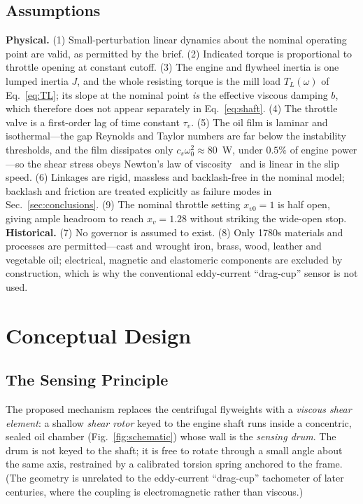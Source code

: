 \documentclass[conference]{IEEEtran}
\begin{document}
\subsection{Assumptions}
\textbf{Physical.} (1) Small-perturbation linear dynamics about the nominal
operating point are valid, as permitted by the brief. (2) Indicated torque is
proportional to throttle opening at constant cutoff. (3) The engine and flywheel
inertia is one lumped inertia $J$, and the whole resisting torque is the mill load
$T_L(\omega)$ of Eq.~\eqref{eq:TL}; its slope at the nominal point \emph{is} the
effective viscous damping $b$, which therefore does not appear separately in
Eq.~\eqref{eq:shaft}. (4) The
throttle valve is a first-order lag of time constant $\tau_v$. (5) The oil film is
laminar and isothermal---the gap Reynolds and Taylor numbers are far below the
instability thresholds, and the film dissipates only
$c_s\omega_0^{2}\approx80$~W, under $0.5\%$ of engine power---so the shear stress
obeys Newton's law of viscosity~\cite{munson} and is linear in the slip speed.
(6) Linkages are rigid, massless and backlash-free in the
nominal model; backlash and friction are treated explicitly as failure modes in
Sec.~\ref{sec:conclusions}. (9) The nominal throttle setting $x_{v0}=1$ is half
open, giving ample headroom to reach $x_v=1.28$ without striking the wide-open stop.
\textbf{Historical.} (7) No governor is assumed to exist. (8) Only 1780s materials
and processes are permitted---cast and wrought iron, brass, wood, leather and
vegetable oil; electrical, magnetic and elastomeric components are excluded by
construction, which is why the conventional eddy-current ``drag-cup'' sensor is
not used.

\section{Conceptual Design}
\subsection{The Sensing Principle}
The proposed mechanism replaces the centrifugal flyweights with a \emph{viscous
shear element}: a shallow \emph{shear rotor} keyed to the engine shaft runs inside a
concentric, sealed oil chamber (Fig.~\ref{fig:schematic}) whose wall is the
\emph{sensing drum}. The drum is not keyed to the shaft; it is free to rotate
through a small angle about the same axis, restrained by a calibrated torsion spring
anchored to the frame. (The geometry is unrelated to the eddy-current ``drag-cup''
tachometer of later centuries, where the coupling is electromagnetic rather than
viscous.)
\end{document}
